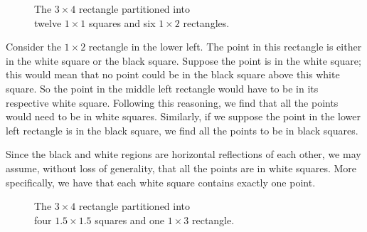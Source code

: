\documentclass[12pt]{article}
\begin{document}
\begin{figure}[ht]
    \centering
    \caption{The $3\times4$ rectangle partitioned into\\ twelve $1\times1$ squares and six $1\times2$ rectangles.}
    \label{fig:checker}
\end{figure}

Consider the $1\times2$ rectangle in the lower left. The point in this rectangle is either in the white square or the black square. Suppose the point is in the white square; this would mean that no point could be in the black square above this white square. So the point in the middle left rectangle would have to be in its respective white square. Following this reasoning, we find that all the points would need to be in white squares. Similarly, if we suppose the point in the lower left rectangle is in the black square, we find all the points to be in black squares.

Since the black and white regions are horizontal reflections of each other, we may assume, without loss of generality, that all the points are in white squares. More specifically, we have that each white square contains exactly one point.


\begin{figure}[ht]
    \centering
    \caption{The $3\times4$ rectangle partitioned into\\ four $1.5\times1.5$ squares and one $1\times3$ rectangle.}
    \label{fig:checker-15}
\end{figure}
\end{document}
